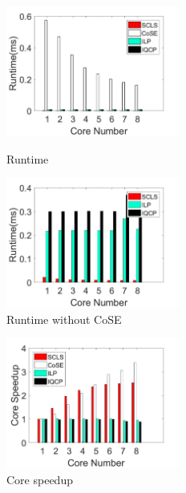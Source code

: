 \begin{figure}[htbp]
\centering
\begin{minipage}[t]{0.3\linewidth}
\centering
\includegraphics[width=2.25in]{figures/runtime}
\caption{Runtime}
\label{fig:normalization runtime}
\end{minipage}
\hfill
\begin{minipage}[t]{0.3\linewidth}
\centering
\includegraphics[width=2.25in]{figures/Runtime_noKSP_noCOSE}\\
  \caption{Runtime without CoSE}\label{fig:Runtime_noKSP_noCOSE}
\end{minipage}
\hfill
\begin{minipage}[t]{0.3\linewidth}
\centering
\includegraphics[width=2.25in]{figures/speedup}
\caption{Core speedup}
\label{fig:Speedup}
\end{minipage}
\end{figure}


